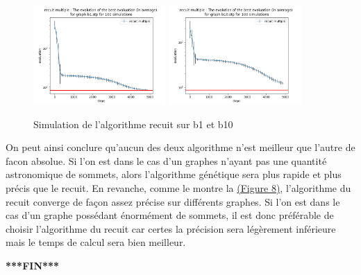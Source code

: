 \documentclass[11pt,french]{report}
\begin{document}
        \begin{figure}
        	\begin{center}
        		\includegraphics[width=0.45\textwidth]{best_b1_evaluation_recuit multiple.png}
        		\includegraphics[width=0.45\textwidth]{b10_evaluation_recuit multiple.png}
        	\end{center}
        	\caption{Simulation de l'algorithme recuit sur b1 et b10}
        	\label{Figure8}
        \end{figure}

        On peut ainsi conclure qu'aucun des deux algorithme n'est meilleur que l'autre de facon absolue. Si l'on est dans le cas d'un graphes n'ayant pas une quantité astronomique de sommets, alors l'algorithme génétique sera plus rapide et plus précis que le recuit. En revanche, comme le montre la \hyperref[Figure8]{(Figure 8)}, l'algorithme du recuit converge de façon assez précise sur différents graphes. Si l'on est dans le cas d'un graphe possédant énormément de sommets, il est donc préférable de choisir l'algorithme du recuit car certes la précision sera légèrement inférieure mais le temps de calcul sera bien meilleur.
        
        \begin{center}
        	\textbf{***FIN***}
        \end{center}
        
\end{document}
